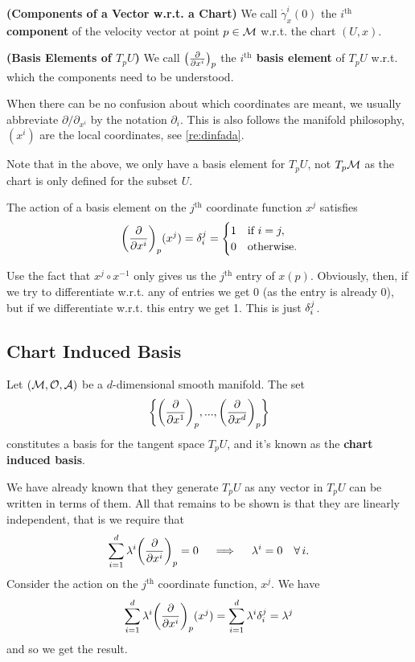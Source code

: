 \documentclass[12pt]{article} %
\newcommand{\bfs}[1]{\textbf{({#1}) }}
\begin{document}
\bd\bfs{Components of a Vector w.r.t. a Chart}
    We call $\dot{\gamma}^i_x(0)$ the \textbf{$i^{\text{th}}$ component} of the velocity vector at point $p\in\mathcal{M}$ w.r.t. the chart $(U,x)$. 
\ed 

\bd\bfs{Basis Elements of $T_pU$}
    We call $\big(\frac{\partial}{\partial x^i}\big)_p$ the \textbf{$i^{\text{th}}$ basis element} of $T_pU$ w.r.t. which the components need to be understood.
\ed 
\begin{rema}
When there can be no confusion about which coordinates are meant, we usually abbreviate $\partial/\partial_{x^i}$ by the notation $\partial_i$. This is also follows the manifold philosophy, $(x^i)$ are the local coordinates, see \cref{re:dinfada}.
\end{rema}

Note that in the above, we only have a basis element for $T_pU$, not $T_p\mathcal{M}$ as the chart is only defined for the subset $U$.

\bc \label{cor:dfda}
    The action of a basis element on the $j^{\text{th}}$ coordinate function $x^j$ satisfies
    \begin{align*} 
        \bigg(\frac{\partial}{\partial x^i}\bigg)_p (x^j )= \delta^j_i = \begin{cases} 
            1 & \text{if } i=j, \\
            0 & \text{otherwise}.
        \end{cases}
    \end{align*} 
\ec 

\bq 
    Use the fact that $x^j\circ x^{-1}$ only gives us the $j^{\text{th}}$ entry of $x(p)$. Obviously, then, if we try to differentiate w.r.t. any of entries we get 0 (as the entry is already 0), but if we differentiate w.r.t. this entry we get 1. This is just $\delta^j_i$. 
\eq 


\subsection{Chart Induced Basis}

\bt\label{cor:dfaf}
    Let $(\mathcal{M},\mathcal{O},\mathcal{A})$ be a $d$-dimensional smooth manifold. The set 
    \begin{align*} 
        \bigg\{ \bigg(\frac{\partial}{\partial x^1}\bigg)_p, ... , \bigg(\frac{\partial}{\partial x^d}\bigg)_p\bigg\}
    \end{align*} 
    constitutes a basis for the tangent space $T_pU$, and it's known as the \textbf{chart induced basis}.
\et

\bq 
    We have already known that they generate $T_pU$ as any vector in $T_pU$ can be written in terms of them. All that remains to be shown is that they are linearly independent, that is we require that
    \begin{align*} 
        \sum_{i=1}^d \lambda^i \bigg(\frac{\p}{\p x^i}\bigg)_p = 0 \quad  \implies \quad \lambda^i = 0 \quad \forall i.
    \end{align*} 
    Consider the action on the $j^{\text{th}}$ coordinate function, $x^j$. We have 
    \begin{align*} 
        \sum_{i=1}^d \lambda^i \bigg(\frac{\partial}{\partial x^i}\bigg)_p (x^j )= \sum_{i=1}^d \lambda^i \delta^j_i = \lambda^j
    \end{align*} 
    and so we get the result. 
\eq 
\end{document}

